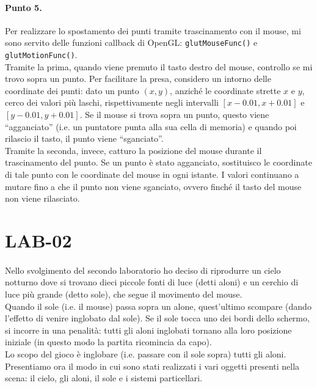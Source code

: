 \documentclass[a4paper, 12pt]{article}
\begin{document}
\paragraph{Punto 5.}
Per realizzare lo spostamento dei punti tramite trascinamento con il mouse, mi sono servito delle funzioni callback di OpenGL: \texttt{glutMouseFunc()} e \texttt{glutMotionFunc()}.\\
Tramite la prima, quando viene premuto il tasto destro del mouse, controllo se mi trovo sopra un punto. Per facilitare la presa, considero un intorno delle coordinate dei punti: dato un punto $(x,y)$, anziché le coordinate strette $x$ e $y$, cerco dei valori più laschi, rispettivamente negli intervalli $[x-0.01, x+0.01]$ e $[y-0.01, y+0.01]$. Se il mouse si trova sopra un punto, questo viene ``agganciato'' (i.e. un puntatore punta alla sua cella di memoria) e quando poi rilascio il tasto, il punto viene ``sganciato''.\\
Tramite la seconda, invece, catturo la posizione del mouse durante il trascinamento del punto. Se un punto è stato agganciato, sostituisco le coordinate di tale punto con le coordinate del mouse in ogni istante. I valori continuano a mutare fino a che il punto non viene sganciato, ovvero finché il tasto del mouse non viene rilasciato.


\section{LAB-02}

\paragraph{}
Nello svolgimento del secondo laboratorio ho deciso di riprodurre un cielo notturno dove si trovano dieci piccole fonti di luce (detti aloni) e un cerchio di luce più grande (detto sole), che segue il movimento del mouse.\\
Quando il sole (i.e. il mouse) passa sopra un alone, quest'ultimo scompare (dando l'effetto di venire inglobato dal sole). Se il sole tocca uno dei bordi dello schermo, si incorre in una penalità: tutti gli aloni inglobati tornano alla loro posizione iniziale (in questo modo la partita ricomincia da capo).\\
Lo scopo del gioco è inglobare (i.e. passare con il sole sopra) tutti gli aloni.\\
Presentiamo ora il modo in cui sono stati realizzati i vari oggetti presenti nella scena: il cielo, gli aloni, il sole e i sistemi particellari.
\end{document}
